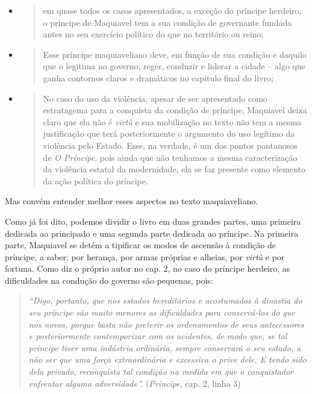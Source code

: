 \begin{itemize}
\item
  \begin{quote}
  em quase todos os casos apresentados, a exceção do príncipe herdeiro,
  o príncipe de Maquiavel tem a sua condição de governante fundada antes
  no seu exercício político do que no território ou reino;
  \end{quote}
\item
  \begin{quote}
  Esse príncipe maquiaveliano deve, em função de sua condição e daquilo
  que o legitima no governo, reger, conduzir e liderar a cidade -- algo
  que ganha contornos claros e dramáticos no capítulo final do livro;
  \end{quote}
\item
  \begin{quote}
  No caso do uso da violência, apesar de ser apresentado como
  estratagema para a conquista da condição de príncipe, Maquiavel deixa
  claro que ela não é \emph{virtù} e sua mobilização no texto não tem a
  mesma justificação que terá posteriormente o argumento do uso legítimo
  da violência pelo Estado. Esse, na verdade, é um dos pontos pantanosos
  de \emph{O Príncipe}, pois ainda que não tenhamos a mesma
  caracterização da violência estatal da modernidade, ela se faz
  presente como elemento da ação política do príncipe.
  \end{quote}
\end{itemize}

Mas convém entender melhor esses aspectos no texto maquiaveliano.

Como já foi dito, podemos dividir o livro em duas grandes partes, uma
primeira dedicada ao principado e uma segunda parte dedicada ao
príncipe. Na primeira parte, Maquiavel se detém a tipificar os modos de
ascensão à condição de príncipe, a saber: por herança, por armas
próprias e alheias, por \emph{virtù} e por fortuna. Como diz o próprio
autor no cap. 2, no caso do príncipe herdeiro, as dificuldades na
condução do governo são pequenas, pois:

\begin{quote}
\emph{``Digo, portanto, que nos estados hereditários e acostumados à
dinastia do seu príncipe são muito menores as dificuldades para
conservá-los do que nos novos, porque basta não preterir os ordenamentos
de seus antecessores e posteriormente contemporizar com os acidentes, de
modo que, se tal príncipe tiver uma indústria ordinária, sempre
conservará o seu estado, a não ser que uma força extraordinária e
excessiva o prive dele. E tendo sido dela privado, reconquista tal
condição na medida em que o conquistador enfrentar alguma
adversidade''.} (\emph{Príncipe}, cap. 2, linha 3)
\end{quote}

